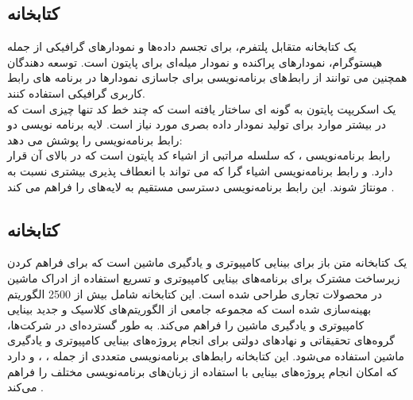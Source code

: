 \subsection{کتابخانه }
 یک کتابخانه متقابل پلتفرم، برای تجسم داده‌ها و نمودارهای گرافیکی از جمله هیستوگرام، نمودارهای پراکنده و نمودار میله‌ای برای 
پایتون است. توسعه دهندگان همچنین می توانند از رابط‌های برنامه‌نویسی   برای جاسازی نمودارها در برنامه های رابط کاربری گرافیکی استفاده کنند.
\\
یک اسکریپت  پایتون به گونه ای ساختار یافته است که چند خط کد تنها چیزی است که در بیشتر موارد برای تولید نمودار داده بصری مورد نیاز است. لایه برنامه نویسی  دو رابط برنامه‌نویسی را پوشش می دهد:
\\
رابط برنامه‌نویسی ، که سلسله مراتبی از اشیاء کد پایتون است که در بالای آن  قرار دارد. و رابط برنامه‌نویسی اشیاء گرا که می تواند 
با انعطاف پذیری بیشتری نسبت به  مونتاژ شوند. این رابط برنامه‌نویسی دسترسی مستقیم به لایه‌های  را فراهم می کند \cite{Introduc75:online}.

\subsection{کتابخانه }
 یک کتابخانه متن باز برای بینایی کامپیوتری و یادگیری ماشین است که برای فراهم کردن زیرساخت مشترک برای برنامه‌های بینایی کامپیوتری و تسریع استفاده از ادراک ماشین در محصولات
تجاری طراحی شده است. این کتابخانه شامل بیش از 2500 الگوریتم بهینه‌سازی شده است که مجموعه جامعی از الگوریتم‌های کلاسیک و جدید بینایی کامپیوتری و یادگیری ماشین 
را فراهم می‌کند.  به طور گسترده‌ای در شرکت‌ها، گروه‌های تحقیقاتی و نهادهای دولتی برای انجام پروژه‌های بینایی کامپیوتری و یادگیری ماشین استفاده می‌شود. این کتابخانه رابط‌های برنامه‌نویسی 
متعددی از جمله ،  ، و  دارد که امکان انجام پروژه‌های بینایی با استفاده از زبان‌های برنامه‌نویسی مختلف را فراهم می‌کند \cite{AboutOpe4:online}.


